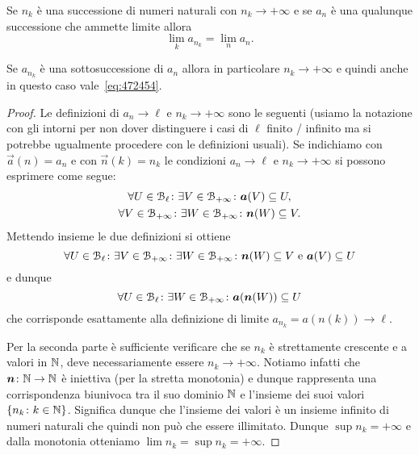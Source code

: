 \begin{theorem}
Se $n_k$ è una successione di numeri naturali con $n_k\to +\infty$
e se $a_n$ è una qualunque successione che ammette limite
allora
\begin{equation}\label{eq:472454}
  \lim_k a_{n_k} = \lim_n a_n.
\end{equation}

Se $a_{n_k}$ è una sottosuccessione di $a_n$ allora in particolare $n_k\to +\infty$
e quindi anche in questo caso vale~\eqref{eq:472454}.
\end{theorem}
%
\begin{proof}
Le definizioni di $a_n \to \ell$ e $n_k \to +\infty$ sono le seguenti
(usiamo la notazione con gli intorni per non dover distinguere
i casi di $\ell$ finito / infinito ma si potrebbe ugualmente
procedere con le definizioni usuali).
Se indichiamo con $\vec a(n)=a_n$ e con $\vec n(k)=n_k$
le condizioni  $a_n\to \ell$ e $n_k\to +\infty$ si possono
esprimere come segue:
\begin{gather*}
 \forall U \in \mathcal B_\ell \colon \exists V \in \mathcal B_{+\infty} \colon
  \boldsymbol a (V) \subseteq U,\\
 \forall V \in \mathcal B_{+\infty} \colon \exists W \in \mathcal B_{+\infty} \colon
  \boldsymbol n(W) \subseteq V.
\end{gather*}
Mettendo insieme le due definizioni si ottiene
\[
  \forall U \in \mathcal B_\ell \colon
  \exists V \in \mathcal B_{+\infty} \colon
  \exists W \in \mathcal B_{+\infty} \colon
  \boldsymbol n(W) \subseteq V \text{ e }
  \boldsymbol a(V) \subseteq U
\]
e dunque
\[
  \forall U \in \mathcal B_\ell \colon \exists W \in \mathcal B_{+\infty} \colon
  \boldsymbol a(\boldsymbol n(W)) \subseteq U
\]
che corrisponde esattamente alla definizione di limite $a_{n_k} = a(n(k)) \to \ell$.

Per la seconda parte è sufficiente verificare che se $n_k$
è strettamente crescente
e a valori in $\mathbb N$, deve necessariamente essere $n_k\to +\infty$.
Notiamo infatti che $\boldsymbol n\colon \mathbb N\to \mathbb N$
è iniettiva (per la stretta monotonia) e dunque rappresenta una
corrispondenza biunivoca tra il suo dominio $\mathbb N$ e l'insieme dei
suoi valori $\{n_k \colon k \in \mathbb N\}$. Significa dunque che l'insieme
dei valori è un insieme infinito di numeri naturali che quindi non può che
essere illimitato. Dunque $\sup n_k = +\infty$ e dalla monotonia
otteniamo $\lim n_k = \sup n_k = +\infty$.
\end{proof}



